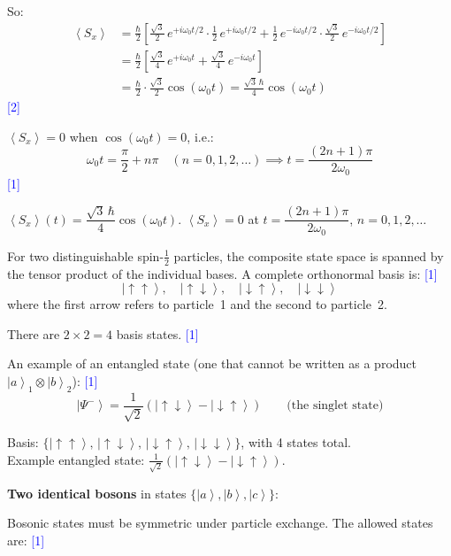 \documentclass[12pt,a4paper]{article}
\newcommand{\markstep}[1]{\hfill\textcolor{blue}{[#1]}}
\newcommand{\finalanswer}[1]{%
  \begin{tcolorbox}[colback=green!5!white,colframe=green!50!black,boxrule=0.5pt]
  #1
  \end{tcolorbox}
}
\renewcommand{\ket}[1]{\left|#1\right\rangle}
\renewcommand{\expect}[1]{\left\langle #1\right\rangle}
\begin{document}
\begin{parts}
So:
\begin{align*}
\expect{S_x} &= \frac{\hbar}{2}\left[\frac{\sqrt{3}}{2}\,e^{+i\omega_0 t/2}\cdot\frac{1}{2}\,e^{+i\omega_0 t/2} + \frac{1}{2}\,e^{-i\omega_0 t/2}\cdot\frac{\sqrt{3}}{2}\,e^{-i\omega_0 t/2}\right] \\
&= \frac{\hbar}{2}\left[\frac{\sqrt{3}}{4}\,e^{+i\omega_0 t} + \frac{\sqrt{3}}{4}\,e^{-i\omega_0 t}\right] \\
&= \frac{\hbar}{2}\cdot\frac{\sqrt{3}}{2}\cos(\omega_0 t) = \frac{\sqrt{3}\,\hbar}{4}\cos(\omega_0 t)
\end{align*}
\markstep{2}

$\expect{S_x} = 0$ when $\cos(\omega_0 t) = 0$, i.e.:
\[
\omega_0 t = \frac{\pi}{2} + n\pi \quad (n = 0, 1, 2, \ldots) \implies t = \frac{(2n+1)\pi}{2\omega_0}
\]
\markstep{1}

\finalanswer{$\expect{S_x}(t) = \dfrac{\sqrt{3}\,\hbar}{4}\cos(\omega_0 t)$. \quad $\expect{S_x} = 0$ at $t = \dfrac{(2n+1)\pi}{2\omega_0}$, $n = 0, 1, 2, \ldots$}

\item For two distinguishable spin-$\tfrac{1}{2}$ particles, the composite state space is spanned by the tensor product of the individual bases. A complete orthonormal basis is: \markstep{1}
\[
\ket{\!\uparrow\uparrow}, \quad \ket{\!\uparrow\downarrow}, \quad \ket{\!\downarrow\uparrow}, \quad \ket{\!\downarrow\downarrow}
\]
where the first arrow refers to particle~1 and the second to particle~2.

There are $2 \times 2 = 4$ basis states. \markstep{1}

An example of an entangled state (one that cannot be written as a product $\ket{a}_1 \otimes \ket{b}_2$): \markstep{1}
\[
\ket{\Psi^-} = \frac{1}{\sqrt{2}}\left(\ket{\!\uparrow\downarrow} - \ket{\!\downarrow\uparrow}\right) \qquad \text{(the singlet state)}
\]

\finalanswer{Basis: $\{\ket{\!\uparrow\uparrow},\,\ket{\!\uparrow\downarrow},\,\ket{\!\downarrow\uparrow},\,\ket{\!\downarrow\downarrow}\}$, with 4 states total.\\
Example entangled state: $\frac{1}{\sqrt{2}}(\ket{\!\uparrow\downarrow} - \ket{\!\downarrow\uparrow})$.}

\item \textbf{Two identical bosons} in states $\{\ket{a},\ket{b},\ket{c}\}$:

Bosonic states must be symmetric under particle exchange. The allowed states are: \markstep{1}


\end{parts}
\end{document}

